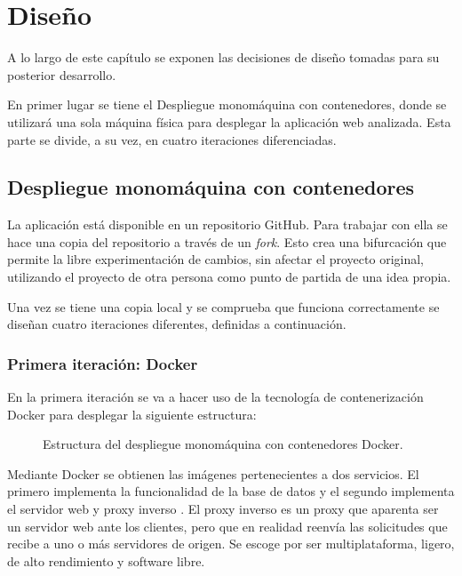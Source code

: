 \chapter{Diseño}
\label{cha:design}

A lo largo de este capítulo se exponen las decisiones de diseño tomadas para su posterior desarrollo.

En primer lugar se tiene el Despliegue monomáquina con contenedores, donde se utilizará una sola máquina física para desplegar la aplicación web analizada. Esta parte se divide, a su vez, en cuatro iteraciones diferenciadas.

\section{Despliegue monomáquina con contenedores}

La aplicación  está disponible en un repositorio GitHub. Para trabajar con ella se hace una copia del repositorio a través de un \textit{fork}. Esto crea una bifurcación que permite la libre experimentación de cambios, sin afectar el proyecto original, utilizando el proyecto de otra persona como punto de partida de una idea propia.

Una vez se tiene una copia local y se comprueba que funciona correctamente se diseñan cuatro iteraciones diferentes, definidas a continuación.

\subsection{Primera iteración: Docker}

En la primera iteración se va a hacer uso de la tecnología de contenerización Docker para desplegar la siguiente estructura:

\begin{figure}[H]
\caption{Estructura del despliegue monomáquina con contenedores Docker.\label{fig:figure_monomachine_docker}}
\end{figure}

Mediante Docker se obtienen las imágenes pertenecientes a dos servicios. El primero implementa la funcionalidad de la base de datos  y el segundo implementa el servidor web y proxy inverso . El proxy inverso es un proxy que aparenta ser un servidor web ante los clientes, pero que en realidad reenvía las solicitudes que recibe a uno o más servidores de origen. Se escoge  por ser multiplataforma, ligero, de alto rendimiento y software libre.

